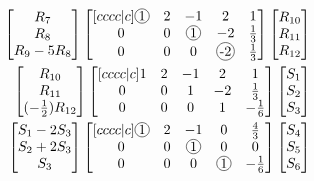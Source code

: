 \documentclass{report}
\newcommand*\circled[1]{\tikz[baseline=(char.base)]{
            \node[shape=circle,draw,inner sep=0.8pt] (char) {#1};}}
\begin{document}
\begin{align*}
\begin{bmatrix}
R_7\\
R_8\\
R_9 - 5R_8\\
\end{bmatrix}
\begin{bmatrix}[cccc|c]
\circled{1} & 2 & -1 & 2 & 1\\
0 & 0 & \circled{1} & -2 & \frac{1}{3}\\
0 & 0 & 0 & \circled{-2} & \frac{1}{3}\\
\end{bmatrix}
\begin{bmatrix}
R_{10}\\ R_{11}\\ R_{12}\\
\end{bmatrix}\\
\begin{bmatrix}
R_{10}\\
R_{11}\\
(-\frac{1}{2})R_{12}\\
\end{bmatrix}
\begin{bmatrix}[cccc|c]
1 & 2 & -1 & 2 & 1\\
0 & 0 & 1 & -2 & \frac{1}{3}\\
0 & 0 & 0 & 1 & -\frac{1}{6}\\
\end{bmatrix}
\begin{bmatrix}
S_1\\ S_2\\ S_3\\
\end{bmatrix}\\
\begin{bmatrix}
S_1 - 2S_3\\
S_2 + 2S_3\\
S_3\\
\end{bmatrix}
\begin{bmatrix}[cccc|c]
\circled{1} & 2 & -1 & 0 & \frac{4}{3}\\
0 & 0 & \circled{1} & 0 & 0\\
0 & 0 & 0 & \circled{1} & -\frac{1}{6}\\
\end{bmatrix}
\begin{bmatrix}
S_4\\ S_5\\ S_6\\

\end{bmatrix}
\end{align*}
\end{document}
